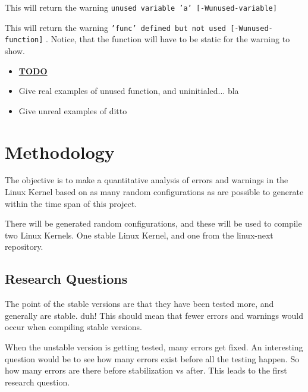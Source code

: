 \documentclass[a4paper,11pt]{article}
\newcommand{\textcode}[1]{
    \texttt{\colorbox{gray!20}{#1}}
}
\begin{document}


This will return the warning \textcode{unused variable 'a' [-Wunused-variable]}




This will return the warning \textcode{'func' defined but not used 
[-Wunused-function]}. Notice, that the function will have to be static for the 
warning to show.


\begin{itemize}
    \item \underline{\textbf{TODO}}
    \item Give real examples of unused function, and uninitialed... bla
    \item Give unreal examples of ditto
\end{itemize}


\newpage
\section{Methodology}

The objective is to make a quantitative analysis of errors and warnings in the 
Linux Kernel based on as many random configurations as are possible to generate 
within the time span of this project.

There will be generated random configurations, and these will be used to 
compile two Linux Kernels. One stable Linux Kernel, and one from the 
linux-next repository.  \\


\subsection{Research Questions}

The point of the stable versions are that they have been tested more, and 
generally are stable. duh! This should mean that fewer errors and warnings 
would occur when compiling stable versions.

When the unstable version is getting tested, many errors get fixed.
An interesting question would be to see how many errors exist before all the 
testing happen. So how many errors are there before stabilization vs after. 
This leads to the first research question.\\
\end{document}
